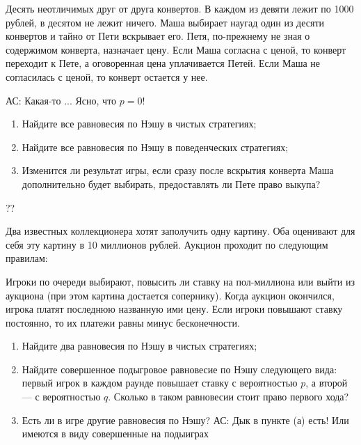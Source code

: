 \begin{problem}
Десять неотличимых друг от друга конвертов. В каждом из девяти лежит по 1000 рублей, в десятом не лежит ничего. Маша выбирает наугад один из десяти конвертов и тайно от Пети вскрывает его. Петя, по-прежнему не зная о содержимом конверта, назначает цену. Если Маша согласна с ценой, то конверт переходит к Пете, а оговоренная цена уплачивается Петей. Если Маша не согласилась с ценой, то конверт остается у нее.\par

{\red АС: Какая-то ... Ясно, что $p=0$!}

\begin{enumerate}
\item Найдите все равновесия по Нэшу в чистых стратегиях;\par
\item Найдите все равновесия по Нэшу в {\red поведенческих} стратегиях;\par
\item  Изменится ли результат игры, если сразу после вскрытия конверта Маша дополнительно будет выбирать, предоставлять ли Пете право выкупа?
\end{enumerate}


\begin{sol}

\end{sol}
\end{problem}



\begin{problem}\par
\begin{source} \cite{cramton:lectures}??\end{source}
Два известных коллекционера хотят заполучить одну картину. Оба оценивают для себя эту картину в 10 миллионов рублей. Аукцион проходит по следующим правилам:\par
Игроки по очереди выбирают, повысить ли ставку на пол-миллиона или выйти из аукциона (при этом картина достается сопернику). Когда аукцион окончился,  игрока платят последнюю названную ими цену. Если игроки повышают ставку постоянно, то их платежи равны минус бесконечности.
\begin{enumerate}
\item Найдите два равновесия по Нэшу в чистых стратегиях;\par
\item Найдите совершенное подыгровое равновесие по Нэшу следующего вида: первый игрок в каждом раунде повышает ставку с вероятностью  $p$, а второй — с вероятностью  $q$. Сколько в таком равновесии стоит право первого хода?\par
\item  Есть ли в игре другие равновесия по Нэшу? {\red АС: Дык в пункте (а) есть! Или имеются в виду совершенные на подыиграх}
\end{enumerate}

\begin{sol}

\end{sol}
\end{problem}




